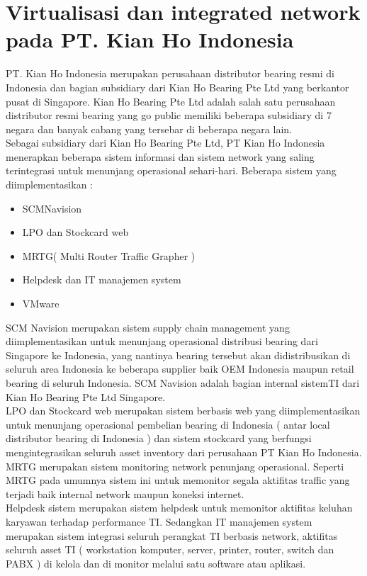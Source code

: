 \section{Virtualisasi  dan integrated network pada PT. Kian Ho Indonesia}
\tab PT. Kian Ho Indonesia merupakan perusahaan distributor bearing resmi di Indonesia dan  bagian subsidiary dari Kian Ho Bearing Pte Ltd yang berkantor pusat di Singapore. Kian Ho Bearing Pte Ltd adalah salah satu perusahaan distributor resmi bearing yang go public memiliki beberapa subsidiary di 7 negara dan banyak cabang yang tersebar di beberapa negara lain.\\
Sebagai subsidiary dari Kian Ho Bearing Pte Ltd, PT Kian Ho Indonesia menerapkan beberapa sistem informasi dan sistem network yang saling terintegrasi untuk menunjang operasional sehari-hari. Beberapa sistem yang diimplementasikan :
\begin{itemize}
\item SCMNavision
\item LPO dan Stockcard web
\item MRTG( Multi Router Traffic Grapher  )
\item Helpdesk dan IT manajemen system
\item VMware
\end{itemize}
SCM Navision merupakan sistem supply chain management yang diimplementasikan untuk menunjang operasional distribusi bearing dari Singapore ke Indonesia, yang nantinya bearing tersebut akan didistribusikan di seluruh area Indonesia ke beberapa supplier baik OEM Indonesia maupun retail bearing di seluruh Indonesia. SCM Navision adalah bagian internal sistemTI dari Kian Ho Bearing Pte Ltd Singapore.\\
LPO dan Stockcard web merupakan sistem berbasis web yang diimplementasikan untuk menunjang operasional pembelian bearing di Indonesia ( antar local distributor bearing di Indonesia ) dan sistem stockcard yang berfungsi mengintegrasikan seluruh asset inventory dari perusahaan PT Kian Ho Indonesia.\\
MRTG merupakan sistem monitoring network penunjang operasional. Seperti MRTG pada umumnya sistem ini untuk memonitor segala aktifitas traffic yang terjadi baik internal network maupun koneksi internet.\\
Helpdesk sistem merupakan sistem helpdesk untuk memonitor aktifitas keluhan karyawan terhadap performance TI. Sedangkan IT manajemen system merupakan sistem integrasi  seluruh perangkat TI berbasis network, aktifitas seluruh asset TI ( workstation komputer, server, printer, router, switch dan PABX ) di kelola dan di monitor melalui satu software atau aplikasi.
